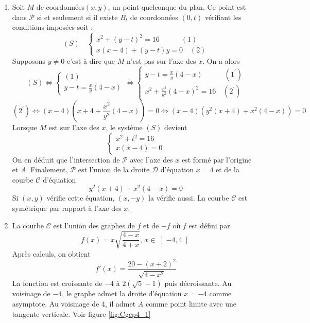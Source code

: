 \begin{enumerate}
\item  Soit $M$ de coordonn{\'e}es$(x,y)$, un point quelconque du plan. Ce point est dans $\mathcal{P}$ si et
seulement si il existe $B_{t}$ de coordonn{\'e}es $(0,t)$ v{\'e}rifiant les conditions impos{\'e}es soit :
\[
(S)\quad \left\{
\begin{array}{c}
x^{2}+(y-t)^{2}=16\quad \quad \quad (1) \\
x(x-4)+(y-t)y=0\quad (2)
\end{array}
\right.
\]
Supposons $y\neq 0$ c'est {\`a} dire que $M$ n'est pas sur l'axe des $x$. On a alors
\[
(S)\Leftrightarrow \left\{
\begin{array}{c}
(1) \\
y-t=\frac{x}{y}(4-x)
\end{array}
\right. \Leftrightarrow \left\{
\begin{array}{c}
y-t=\frac{x}{y}(4-x)\quad \quad \quad (1^{\prime }) \\
x^{2}+\frac{x^{2}}{y^{2}}(4-x)^{2}=16\quad (2^{\prime })
\end{array}
\right.
\]
\[
(2^{\prime })\Leftrightarrow (x-4)(x+4+\frac{x^{2}}{y^{2}}%
(4-x))=0\Leftrightarrow (x-4)(y^{2}(x+4)+x^{2}(4-x))=0
\]
Lorsque $M$ est sur l'axe des $x$, le syst{\`e}me $(S)$ devient
\[
\left\{
\begin{array}{c}
x^{2}+t^{2}=16 \\
x(x-4)=0
\end{array}
\right.
\]
On en d{\'e}duit que l'intersection de $\mathcal{P}$ avec l'axe des $x$ est form{\'e} par l'origine et $A$. Finalement, $\mathcal{P}$ est l'union de la droite $\mathcal{D}$ d'{\'e}quation $x=4$ et de la courbe $\mathcal{C}$ d'{\'e}quation
\[
y^{2}(x+4)+x^{2}(4-x)=0
\]
Si $(x,y)$ v{\'e}rifie cette {\'e}quation, $(x,-y)$ la v{\'e}rifie aussi. La courbe $\mathcal{C}$ est sym{\'e}trique par rapport {\`a} l'axe des $x$.

\item La courbe $\mathcal{C}$ est l'union des graphes de $f$ et de $-f$ o{\`u} $f$ est d{\'e}fini par
\[
f(x)=x\sqrt{\frac{4-x}{4+x}}\text{, }x\in \left] -4,4\right[
\]
Apr{\`e}s calculs, on obtient 
\begin{displaymath}
 f'(x)=\dfrac{20-(x+2)^{2}}{\sqrt{4-x^{2}}}
\end{displaymath}
La fonction est croissante de $-4$ {\`a} $2(\sqrt{5}-1)$ puis d{\'e}croissante.\newline
Au voisinage de $-4$, le graphe admet la droite d'{\'e}quation $x=-4$ comme asymptote. Au voisinage de 4, il admet $A$ comme point limite avec une tangente verticale. Voir figure \ref{fig:Cgep4_1}


\end{enumerate}
